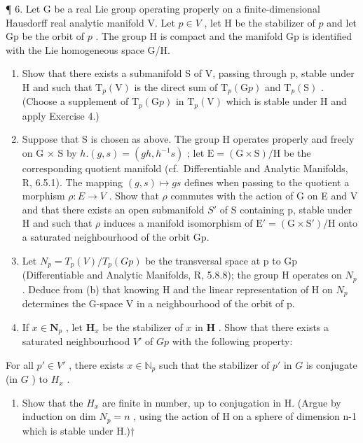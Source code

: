 ¶ 6. Let G be a real Lie group operating properly on a finite-dimensional Hausdorff real analytic manifold V. Let \(p \in V\) , let H be the stabilizer of \(p\) and let Gp be the orbit of \(p\) . The group H is compact and the manifold Gp is identified with the Lie homogeneous space G/H.

\begin{enumerate}
\def\labelenumi{(\alph{enumi})}
\item
  Show that there exists a submanifold S of V, passing through p, stable under H and such that \(\mathrm{T}_{p}(\mathrm{V})\) is the direct sum of \(\mathrm{T}_{p}(\mathrm{G}p)\) and \(\mathrm{T}_{p}(\mathrm{S})\) . (Choose a supplement of \(\mathrm{T}_{p}(\mathrm{G}p)\) in \(\mathrm{T}_{p}(\mathrm{V})\) which is stable under H and apply Exercise 4.)
\item
  Suppose that S is chosen as above. The group H operates properly and freely on G × S by \(h.(g,s)=(gh,h^{-1}s)\) ; let \(\mathrm{E}=(\mathrm{G}\times\mathrm{S})/\mathrm{H}\) be the corresponding quotient manifold (cf.~Differentiable and Analytic Manifolds, R, 6.5.1). The mapping \((g,s)\mapsto gs\) defines when passing to the quotient a morphism \(\rho:E\to V\) . Show that \(\rho\) commutes with the action of G on E and V and that there exists an open submanifold \(S'\) of S containing p, stable under H and such that \(\rho\) induces a manifold isomorphism of \(\mathrm{E}'=(\mathrm{G}\times\mathrm{S}')/\mathrm{H}\) onto a saturated neighbourhood of the orbit Gp.
\item
  Let \(N_{p} = T_{p}(V)/T_{p}(Gp)\) be the transversal space at p to Gp (Differentiable and Analytic Manifolds, R, 5.8.8); the group H operates on \(N_{p}\) . Deduce from (b) that knowing H and the linear representation of H on \(N_{p}\) determines the G-space V in a neighbourhood of the orbit of p.
\item
  If \(x \in \mathbf{N}_p\) , let \(\mathbf{H}_x\) be the stabilizer of \(x\) in \(\mathbf{H}\) . Show that there exists a saturated neighbourhood \(V'\) of \(Gp\) with the following property:
\end{enumerate}

For all \(p' \in V'\) , there exists \(x \in \mathbb{N}_p\) such that the stabilizer of \(p'\) in \(G\) is conjugate (in \(G\) ) to \(H_x\) .

\begin{enumerate}
\def\labelenumi{(\alph{enumi})}
\setcounter{enumi}{4}
\tightlist
\item
  Show that the \(H_{x}\) are finite in number, up to conjugation in H. (Argue by induction on dim \(N_{p}=n\) , using the action of H on a sphere of dimension n-1 which is stable under H.)†
\end{enumerate}

